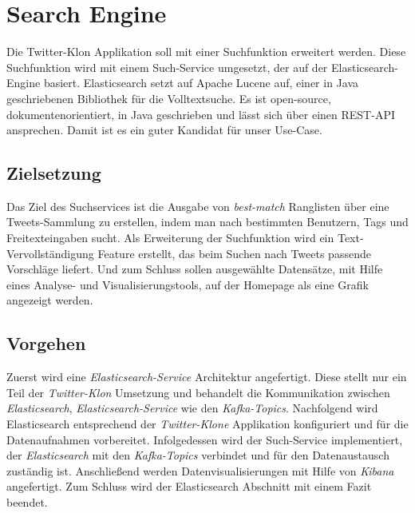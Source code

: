 \chapter{Search Engine}
Die Twitter-Klon Applikation soll mit einer Suchfunktion erweitert werden. Diese Suchfunktion wird mit einem Such-Service umgesetzt, der auf der Elasticsearch-Engine \cite{elasticsearch} basiert. Elasticsearch setzt auf Apache Lucene \cite{lucene} auf, einer in Java geschriebenen Bibliothek für die Volltextsuche. Es ist open-source, dokumentenorientiert, in Java geschrieben und lässt sich über einen REST-API ansprechen. Damit ist es ein guter Kandidat für unser Use-Case.

\section{Zielsetzung}
Das Ziel des Suchservices ist die Ausgabe von \textit{best-match} Ranglisten über eine Tweets-Sammlung zu erstellen, indem man nach bestimmten Benutzern, Tags und Freitexteingaben sucht. Als Erweiterung der Suchfunktion wird ein Text-Vervollständigung Feature erstellt, das beim Suchen nach Tweets passende Vorschläge liefert. Und zum Schluss sollen ausgewählte Datensätze, mit Hilfe eines Analyse- und Visualisierungstools, auf der Homepage als eine Grafik angezeigt werden. 

\section{Vorgehen}
Zuerst wird eine \textit{Elasticsearch-Service} Architektur angefertigt. Diese stellt nur ein Teil der \textit{Twitter-Klon} Umsetzung und behandelt die Kommunikation zwischen \textit{Elasticsearch}, \textit{Elasticsearch-Service} wie den \textit{Kafka-Topics}. Nachfolgend wird Elasticsearch entsprechend der \textit{Twitter-Klone} Applikation konfiguriert und für die Datenaufnahmen vorbereitet. Infolgedessen wird der Such-Service implementiert, der \textit{Elasticsearch} mit den \textit{Kafka-Topics} verbindet und für den Datenaustausch zuständig ist. Anschließend werden Datenvisualisierungen mit Hilfe von \textit{Kibana} angefertigt. Zum Schluss wird der Elasticsearch Abschnitt mit einem Fazit beendet.

